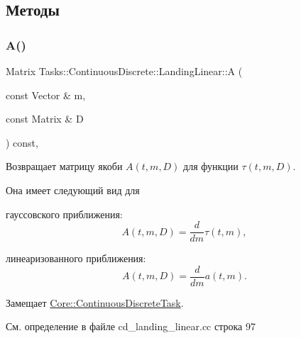 \subsection{Методы}
\hypertarget{class_tasks_1_1_continuous_discrete_1_1_landing_linear_ae584bc7b596882f07b18d2a39dcdfa32}{}\label{class_tasks_1_1_continuous_discrete_1_1_landing_linear_ae584bc7b596882f07b18d2a39dcdfa32} 
\subsubsection{\texorpdfstring{A()}{A()}}
{\footnotesize\ttfamily Matrix Tasks\+::\+Continuous\+Discrete\+::\+Landing\+Linear\+::A (\begin{DoxyParamCaption}\item[{const Vector \&}]{m,  }\item[{const Matrix \&}]{D }\end{DoxyParamCaption}) const\hspace{0.3cm}{\ttfamily [override]}, {\ttfamily [virtual]}}



Возвращает матрицу якоби $A(t, m, D)$ для функции $\tau(t, m, D)$. 

Она имеет следующий вид для


\begin{DoxyItemize}
\item гауссовского приближения\+: \[A(t, m, D) = \frac{d}{dm} \tau(t, m),\]
\item линеаризованного приближения\+: \[A(t, m, D) = \frac{d}{dm} a(t, m).\] 
\end{DoxyItemize}

Замещает \hyperlink{class_core_1_1_continuous_discrete_task_a332d99b61aabb919bffe75d0eec05cfe}{Core\+::\+Continuous\+Discrete\+Task}.



См. определение в файле cd\+\_\+landing\+\_\+linear.\+cc строка 97

\hypertarget{class_tasks_1_1_continuous_discrete_1_1_landing_linear_aa3bddd1de01a202030bbccc1994e10af}{}\label{class_tasks_1_1_continuous_discrete_1_1_landing_linear_aa3bddd1de01a202030bbccc1994e10af} 
